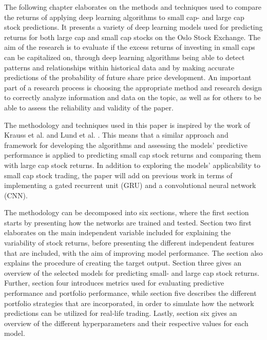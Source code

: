 The following chapter elaborates on the methods and techniques used to compare the returns of applying deep learning algorithms to small cap- and large cap stock predictions. It presents a variety of deep learning models used for predicting returns for both large cap and small cap stocks on the Oslo Stock Exchange. The aim of the research is to evaluate if the excess returns of investing in small caps can be capitalized on, through deep learning algorithms being able to detect patterns and relationships within historical data and by making accurate predictions of the probability of future share price development. An important part of a research process is choosing the appropriate method and research design to correctly analyze information and data on the topic, as well as for others to be able to assess the reliability and validity of the paper. 

\indent\newline
The methodology and techniques used in this paper is inspired by the work of Krauss et al. and Lund et al. \cite{krauss} \cite{lund}. This means that a similar approach and framework for developing the algorithms and assessing the models' predictive performance is applied to predicting small cap stock returns and comparing them with large cap stock returns. In addition to exploring the models' applicability to small cap stock trading, the paper will add on previous work in terms of implementing a gated recurrent unit (GRU) and a convolutional neural network (CNN).   

\indent\newline
The methodology can be decomposed into six sections, where the first section starts by presenting how the networks are trained and tested. Section two first elaborates on the main independent variable included for explaining the variability of stock returns, before presenting the different independent features that are included, with the aim of improving model performance. The section also explains the procedure of creating the target output. Section three gives an overview of the selected models for predicting small- and large cap stock returns. Further, section four introduces metrics used for evaluating predictive performance and portfolio performance, while section five describes the different portfolio strategies that are incorporated, in order to simulate how the network predictions can be utilized for real-life trading. Lastly, section six gives an overview of the different hyperparameters and their respective values for each model.

